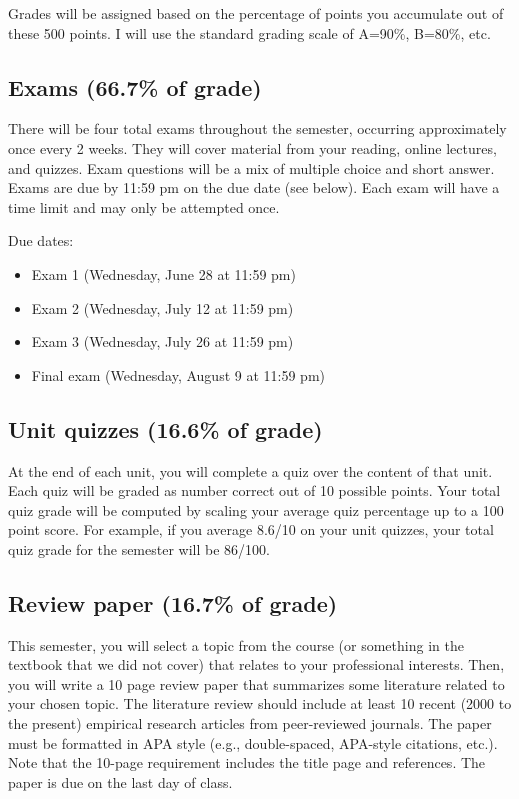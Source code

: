 \documentclass[10pt]{article}
\begin{document}
Grades will be assigned based on the percentage of points you accumulate out of these 500 points.  I will use the standard grading scale of A=90\%, B=80\%, etc.

\subsection*{Exams (66.7\% of grade)}
\label{sec-6-1}
There will be four total exams throughout the semester, occurring 
approximately once every 2  weeks.  They will cover material 
from your reading, online lectures, and quizzes.  Exam questions will be a mix of multiple choice and short answer.  Exams are due by 11:59 pm on 
the due date (see below).  Each exam will have a time limit and may only 
be attempted once.

Due dates:

\begin{itemize}
\item Exam 1 (Wednesday, June 28 at 11:59 pm)
\item Exam 2 (Wednesday, July 12 at 11:59 pm)
\item Exam 3 (Wednesday, July 26 at 11:59 pm)
\item Final exam (Wednesday, August 9 at 11:59 pm)
\end{itemize}

\subsection*{Unit quizzes (16.6\% of grade)}
\label{sec-6-2}
At the end of each unit, you will complete a quiz over the content of that 
unit. Each quiz will be graded as number correct out of 10 possible points.  Your total quiz grade will be computed by scaling your average quiz percentage up to a 100 point score.  For example, if you average 8.6/10 on your unit quizzes, your total quiz grade for the semester will be 86/100. 

\subsection*{Review paper (16.7\% of grade)}
\label{sec-6-3}
This semester, you will select a topic from the course (or something in the textbook that we did not cover) that relates to your professional interests.  Then, you will write a 10 page review paper that summarizes some literature related to your chosen topic. The literature review should include at least 10 recent (2000 to the present) empirical research articles from peer-reviewed journals. The paper must be formatted in APA style (e.g., double-spaced, APA-style citations, etc.).  Note that the 10-page requirement includes the title page and references.  The paper is due on the last day of class.   
\end{document}
